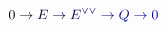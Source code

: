 \documentclass[12pt]{article}
\begin{document}
\makeatletter
\renewcommand*{\@textcolor}[3]{%
  \protect\leavevmode
  \begingroup
    \color#1{#2}#3%
  \endgroup
}
\makeatother
\begin{displaymath}
\mathcolor[RGB]{0,0,15}{0} \mathcolor[RGB]{0,0,30}{\rightarrow} \mathcolor[RGB]{0,0,45}{E} \mathcolor[RGB]{0,0,60}{\rightarrow} \mathcolor[RGB]{0,0,75}{E} ^ { \mathcolor[RGB]{0,0,90}{\vee} \mathcolor[RGB]{0,0,105}{\vee} } \mathcolor[RGB]{0,0,120}{\rightarrow} \mathcolor[RGB]{0,0,135}{Q} \mathcolor[RGB]{0,0,150}{\rightarrow} \mathcolor[RGB]{0,0,165}{0}
\end{displaymath}
\end{document}
